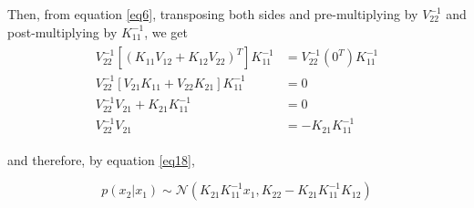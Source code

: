Then, from equation \ref{eq6}, transposing both sides and pre-multiplying by $V_{22}^{-1}$ and post-multiplying by $K_{11}^{-1}$, we get
\begin{align}
\label{eq23}
\begin{split}
V_{22}^{-1}\left[({K}_{11}{V}_{12} + {K}_{12}{V}_{22})^{T}\right]K_{11}^{-1} & = V_{22}^{-1}(0^T)K_{11}^{-1} \\
V_{22}^{-1}\left[{V}_{21}K_{11} + {V}_{22}{K}_{21}\right]K_{11}^{-1} & = 0 \\
V_{22}^{-1}{V}_{21} + {K}_{21}K_{11}^{-1} & = 0 \\
V_{22}^{-1}{V}_{21} & = -{K}_{21}K_{11}^{-1}
\end{split}
\end{align}

and therefore, by equation \ref{eq18},

\begin{equation}\label{eq24}
p(x_2|x_1) \sim \mathcal{N}(K_{21}K_{11}^{-1}x_1,K_{22}-K_{21}K_{11}^{-1}K_{12})
\end{equation}
